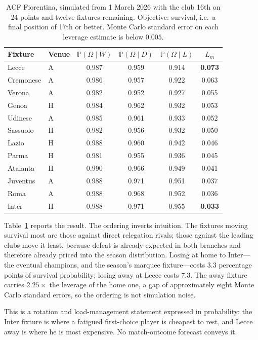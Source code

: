 \documentclass[11pt]{article}
\newcommand{\Prob}{\mathbb{P}}
\begin{document}
\begin{table}[t]
\centering
\caption{ACF Fiorentina, simulated from 1 March 2026 with the club 16th on 24
points and twelve fixtures remaining. Objective: survival, i.e.\ a final
position of 17th or better. Monte Carlo standard error on each leverage
estimate is below $0.005$.}
\label{tab:leverage}
\small
\begin{tabular}{llcccc}
\toprule
Fixture & Venue & $\Prob(\Omega \mid W)$ & $\Prob(\Omega \mid D)$ & $\Prob(\Omega \mid L)$ & $L_m$ \\
\midrule
Lecce      & A & 0.987 & 0.959 & 0.914 & \textbf{0.073} \\
Cremonese  & A & 0.986 & 0.957 & 0.922 & 0.063 \\
Verona     & A & 0.982 & 0.952 & 0.927 & 0.055 \\
Genoa      & H & 0.984 & 0.962 & 0.932 & 0.053 \\
Udinese    & A & 0.985 & 0.961 & 0.933 & 0.052 \\
Sassuolo   & H & 0.982 & 0.956 & 0.932 & 0.050 \\
Lazio      & H & 0.988 & 0.960 & 0.942 & 0.046 \\
Parma      & H & 0.981 & 0.955 & 0.936 & 0.045 \\
Atalanta   & H & 0.990 & 0.966 & 0.949 & 0.041 \\
Juventus   & A & 0.988 & 0.971 & 0.951 & 0.037 \\
Roma       & A & 0.988 & 0.968 & 0.952 & 0.036 \\
Inter      & H & 0.988 & 0.971 & 0.955 & \textbf{0.033} \\
\bottomrule
\end{tabular}
\end{table}

Table~\ref{tab:leverage} reports the result. The ordering inverts intuition.
The fixtures moving survival most are those against direct relegation rivals;
those against the leading clubs move it least, because defeat is already
expected in both branches and therefore already priced into the season
distribution. Losing at home to Inter---the eventual champions, and the
season's marquee fixture---costs $3.3$ percentage points of survival
probability; losing away at Lecce costs $7.3$. The away fixture carries
$2.25\times$ the leverage of the home one, a gap of approximately eight Monte
Carlo standard errors, so the ordering is not simulation noise.

This is a rotation and load-management statement expressed in probability: the
Inter fixture is where a fatigued first-choice player is cheapest to rest, and
Lecce away is where he is most expensive. No match-outcome forecast conveys it.
\end{document}
